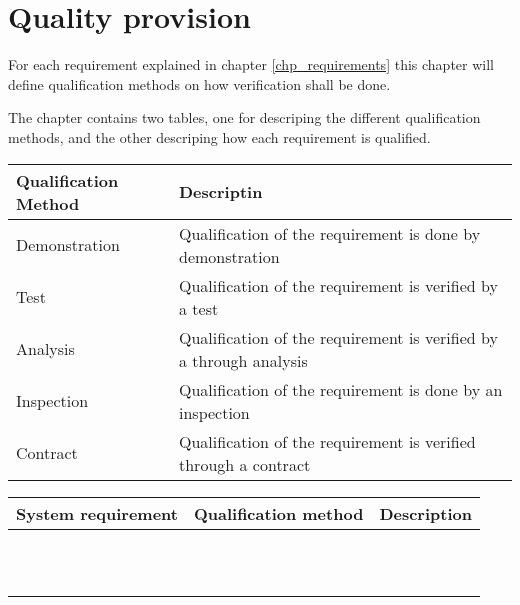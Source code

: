 \label{chp_qualityProvision}
\chapter{Quality provision}
For each requirement explained in chapter \ref{chp_requirements} this chapter will define qualification methods on how verification shall be done.

The chapter contains two tables, one for descriping the different qualification methods, and the other descriping how each requirement is qualified.

\begin{longtable}{| p{4.2cm}  | p{7.8cm} |  }
	\hline
	\textbf{Qualification Method}	& \textbf{Descriptin} \\ \hline
	Demonstration					& Qualification of the requirement is done by demonstration \\ \hline
	Test							& Qualification of the requirement is verified by a test\\ \hline
	Analysis						& Qualification of the requirement is verified by a through analysis \\ \hline
	Inspection						& Qualification of the requirement is done by an inspection \\ \hline
	Contract						& Qualification of the requirement is verified through a contract \\ \hline
\end{longtable}

\begin{longtable}{| p{2.4cm}  | p{2.6cm} | p{6.6cm} |  }
	\hline
	\textbf{System requirement}	& \textbf{Qualification method} & \textbf{Description} \\ \hline
	&& \\ \hline
	&& \\ \hline
	&& \\ \hline
	&& \\ \hline
	&& \\ \hline
	&& \\ \hline
	&& \\ \hline
	&& \\ \hline
	&& \\ \hline
	&& \\ \hline
	&& \\ \hline
	
\end{longtable}